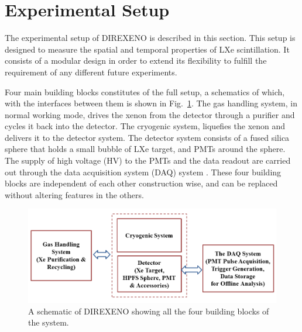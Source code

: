 \section{Experimental Setup}
\label{expSetup}


The experimental setup of DIREXENO is described in this section. This setup is 
designed to measure the spatial and temporal properties of LXe scintillation. 
It consists of a modular design in order to extend its flexibility
to fulfill the requirement of any different future experiments. 

Four main building blocks constitutes of the full setup, a schematics 
of which, with the interfaces between them is shown in Fig.~\ref{fig:fullschematics}. The gas handling system, in normal working mode, drives the xenon from the detector through a purifier and cycles it back into the detector. The cryogenic system, liquefies the xenon and delivers it to the detector system. The detector system consists of a fused silica sphere that holds a small bubble of LXe target, and PMTs around the sphere. The supply of high voltage (HV) to the PMTs and the data readout are carried out through the 
data acquisition system (DAQ) system . These four building blocks are independent of each other construction wise, and can be replaced without altering features in the others. 

\begin{figure}[h]
\centerline{\includegraphics[width=0.8\linewidth]{WholeSys.png}}
\caption{A schematic of DIREXENO showing all the four building blocks of the system.}
\label{fig:fullschematics}
\end{figure}

